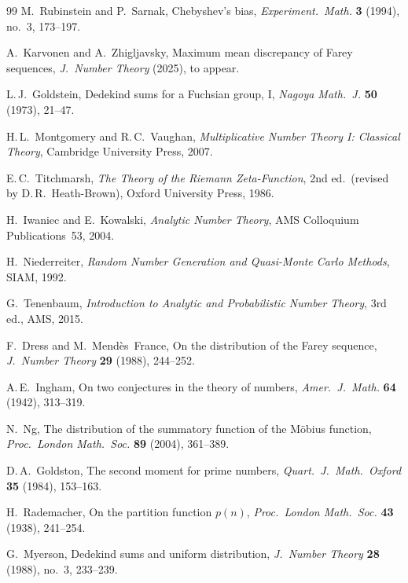 \documentclass[11pt]{article}
\theoremstyle{definition}
\begin{document}
\begin{thebibliography}{99}
M.~Rubinstein and P.~Sarnak,
Chebyshev's bias,
\textit{Experiment.\ Math.} \textbf{3} (1994), no.~3, 173--197.

A.~Karvonen and A.~Zhigljavsky,
Maximum mean discrepancy of Farey sequences,
\textit{J.~Number Theory} (2025), to appear.

L.\,J.~Goldstein,
Dedekind sums for a Fuchsian group, I,
\textit{Nagoya Math.~J.} \textbf{50} (1973), 21--47.

H.\,L.~Montgomery and R.\,C.~Vaughan,
\textit{Multiplicative Number Theory I: Classical Theory},
Cambridge University Press, 2007.

E.\,C.~Titchmarsh,
\textit{The Theory of the Riemann Zeta-Function},
2nd ed.\ (revised by D.\,R.~Heath-Brown),
Oxford University Press, 1986.

H.~Iwaniec and E.~Kowalski,
\textit{Analytic Number Theory},
AMS Colloquium Publications~53, 2004.

H.~Niederreiter,
\textit{Random Number Generation and Quasi-Monte Carlo Methods},
SIAM, 1992.

G.~Tenenbaum,
\textit{Introduction to Analytic and Probabilistic Number Theory},
3rd ed., AMS, 2015.

F.~Dress and M.~Mend\`es~France,
On the distribution of the Farey sequence,
\textit{J.~Number Theory} \textbf{29} (1988), 244--252.

A.\,E.~Ingham,
On two conjectures in the theory of numbers,
\textit{Amer.~J.~Math.} \textbf{64} (1942), 313--319.

N.~Ng,
The distribution of the summatory function of the M\"obius function,
\textit{Proc.\ London Math.\ Soc.} \textbf{89} (2004), 361--389.

D.\,A.~Goldston,
The second moment for prime numbers,
\textit{Quart.~J.~Math.\ Oxford} \textbf{35} (1984), 153--163.

H.~Rademacher,
On the partition function $p(n)$,
\textit{Proc.\ London Math.\ Soc.} \textbf{43} (1938), 241--254.

G.~Myerson,
Dedekind sums and uniform distribution,
\textit{J.~Number Theory} \textbf{28} (1988), no.~3, 233--239.

\end{thebibliography}
\end{document}

